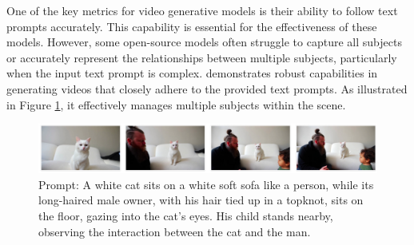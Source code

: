 One of the key metrics for video generative models is their ability to follow text prompts accurately. This capability is essential for the effectiveness of these models. However, some open-source models often struggle to capture all subjects or accurately represent the relationships between multiple subjects, particularly when the input text prompt is complex.
%
\nameofmethod{} demonstrates robust capabilities in generating videos that closely adhere to the provided text prompts. As illustrated in Figure \ref{fig:text-align}, it effectively manages multiple subjects within the scene.

\begin{figure}[h]
    \centering
    \includegraphics[width=\linewidth]{figures/text_alignment.png}
    \caption{{Prompt: A white cat sits on a white soft sofa like a person, while its long-haired male owner, with his hair tied up in a topknot, sits on the floor, gazing into the cat's eyes. His child stands nearby, observing the interaction between the cat and the man. } }
    \label{fig:text-align}
\end{figure}